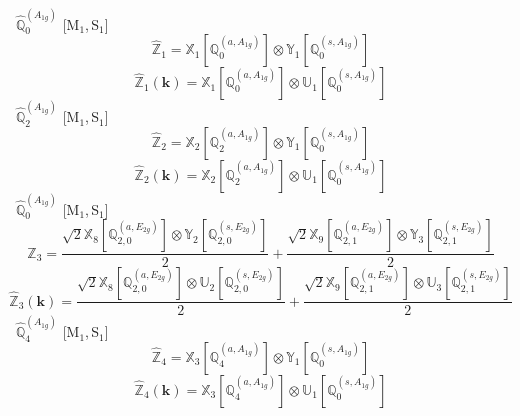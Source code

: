 \documentclass[fleqn,10pt,landscape]{article}
\begin{document}
\begin{itemize}
\vspace{4mm}
\noindent {} $\,\,\,\hat{\mathbb{Q}}_{0}^{(A_{1g})}$ [M$_{1}$,\,S$_{1}$]
\begin{dmath*}
\hat{\mathbb{Z}}_{1}=\mathbb{X}_{1}[\mathbb{Q}_{0}^{(a,A_{1g})}] \otimes\mathbb{Y}_{1}[\mathbb{Q}_{0}^{(s,A_{1g})}]
\end{dmath*}
\begin{dmath*}
\hat{\mathbb{Z}}_{1}(\bm{k})=\mathbb{X}_{1}[\mathbb{Q}_{0}^{(a,A_{1g})}] \otimes\mathbb{U}_{1}[\mathbb{Q}_{0}^{(s,A_{1g})}]
\end{dmath*}
\vspace{4mm}
\noindent {} $\,\,\,\hat{\mathbb{Q}}_{2}^{(A_{1g})}$ [M$_{1}$,\,S$_{1}$]
\begin{dmath*}
\hat{\mathbb{Z}}_{2}=\mathbb{X}_{2}[\mathbb{Q}_{2}^{(a,A_{1g})}] \otimes\mathbb{Y}_{1}[\mathbb{Q}_{0}^{(s,A_{1g})}]
\end{dmath*}
\begin{dmath*}
\hat{\mathbb{Z}}_{2}(\bm{k})=\mathbb{X}_{2}[\mathbb{Q}_{2}^{(a,A_{1g})}] \otimes\mathbb{U}_{1}[\mathbb{Q}_{0}^{(s,A_{1g})}]
\end{dmath*}
\vspace{4mm}
\noindent {} $\,\,\,\hat{\mathbb{Q}}_{0}^{(A_{1g})}$ [M$_{1}$,\,S$_{1}$]
\begin{dmath*}
\hat{\mathbb{Z}}_{3}=\frac{\sqrt{2} \mathbb{X}_{8}[\mathbb{Q}_{2,0}^{(a,E_{2g})}] \otimes\mathbb{Y}_{2}[\mathbb{Q}_{2,0}^{(s,E_{2g})}]}{2} + \frac{\sqrt{2} \mathbb{X}_{9}[\mathbb{Q}_{2,1}^{(a,E_{2g})}] \otimes\mathbb{Y}_{3}[\mathbb{Q}_{2,1}^{(s,E_{2g})}]}{2}
\end{dmath*}
\begin{dmath*}
\hat{\mathbb{Z}}_{3}(\bm{k})=\frac{\sqrt{2} \mathbb{X}_{8}[\mathbb{Q}_{2,0}^{(a,E_{2g})}] \otimes\mathbb{U}_{2}[\mathbb{Q}_{2,0}^{(s,E_{2g})}]}{2} + \frac{\sqrt{2} \mathbb{X}_{9}[\mathbb{Q}_{2,1}^{(a,E_{2g})}] \otimes\mathbb{U}_{3}[\mathbb{Q}_{2,1}^{(s,E_{2g})}]}{2}
\end{dmath*}
\vspace{4mm}
\noindent {} $\,\,\,\hat{\mathbb{Q}}_{4}^{(A_{1g})}$ [M$_{1}$,\,S$_{1}$]
\begin{dmath*}
\hat{\mathbb{Z}}_{4}=\mathbb{X}_{3}[\mathbb{Q}_{4}^{(a,A_{1g})}] \otimes\mathbb{Y}_{1}[\mathbb{Q}_{0}^{(s,A_{1g})}]
\end{dmath*}
\begin{dmath*}
\hat{\mathbb{Z}}_{4}(\bm{k})=\mathbb{X}_{3}[\mathbb{Q}_{4}^{(a,A_{1g})}] \otimes\mathbb{U}_{1}[\mathbb{Q}_{0}^{(s,A_{1g})}]

\end{dmath*}
\end{itemize}
\end{document}
